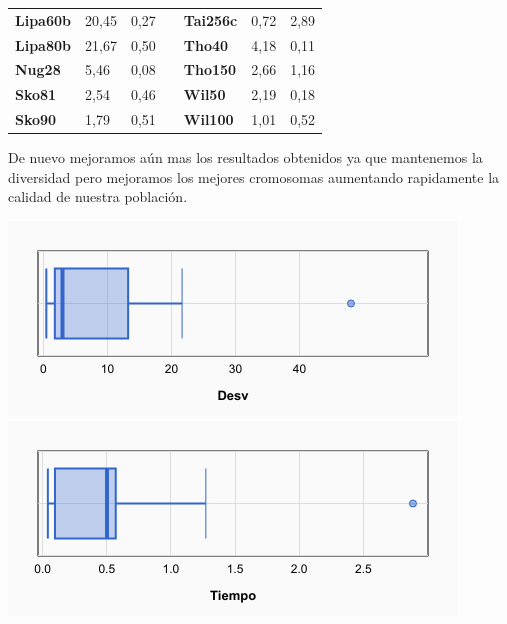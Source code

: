 \documentclass[a4paper, 12pt]{article}
\begin{document}
\begin{table}[H]
\begin{tabular}{|l|l|l|l|l|l|l|}
\textbf{Lipa60b}                    & 20,45                              & 0,27                                 &                       & \textbf{Tai256c}                   & 0,72                               & 2,89                                 \\ \cline{1-3} \cline{5-7} 
\textbf{Lipa80b}                    & 21,67                              & 0,50                                 &                       & \textbf{Tho40}                     & 4,18                               & 0,11                                 \\ \cline{1-3} \cline{5-7} 
\textbf{Nug28}                      & 5,46                               & 0,08                                 &                       & \textbf{Tho150}                    & 2,66                               & 1,16                                 \\ \cline{1-3} \cline{5-7} 
\textbf{Sko81}                      & 2,54                               & 0,46                                 &                       & \textbf{Wil50}                     & 2,19                               & 0,18                                 \\ \cline{1-3} \cline{5-7} 
\textbf{Sko90}                      & 1,79                               & 0,51                                 &                       & \textbf{Wil100}                    & 1,01                               & 0,52                                 \\ \cline{1-3} \cline{5-7} 
\end{tabular}
\end{table}

	De nuevo mejoramos aún mas los resultados obtenidos ya que mantenemos la diversidad pero mejoramos los mejores cromosomas aumentando rapidamente la calidad de nuestra población.

\begin{center}
         \includegraphics[scale=0.5]{boxplot-am(1-01mej)-desv}
         \includegraphics[scale=0.5]{boxplot-am(1-01mej)-time}
      \end{center}
      
\end{document}
